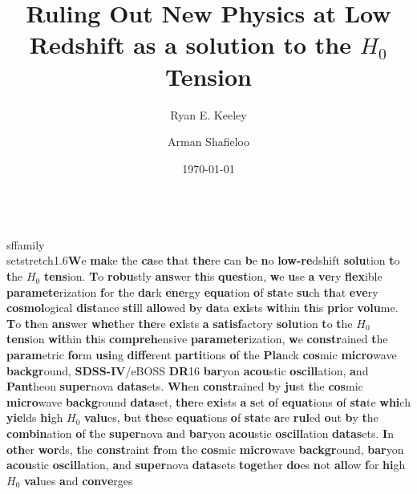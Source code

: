 \documentclass[
\\usepackage{setspace} reprint,
 amsmath,amssymb,
 aps,
]{revtex4-2}
\begin{document}

\title{Ruling Out New Physics at Low Redshift as a solution to the $H_0$ Tension}

\author{Ryan E. Keeley}
\author{Arman Shafieloo}




\date{\today}

\\sffamily\\setstretch{1.6}\textbf{W}e \textbf{ma}ke \textbf{t}he \textbf{ca}se \textbf{th}at \textbf{the}re \textbf{c}an \textbf{b}e \textbf{n}o \textbf{low-re}dshift \textbf{solu}tion \textbf{t}o \textbf{t}he $H_0$ \textbf{tens}ion. \textbf{T}o \textbf{robu}stly \textbf{ans}wer \textbf{th}is \textbf{quest}ion, \textbf{w}e \textbf{u}se \textbf{a} \textbf{ve}ry \textbf{flex}ible \textbf{paramete}rization \textbf{f}or \textbf{t}he \textbf{da}rk \textbf{ene}rgy \textbf{equa}tion \textbf{o}f \textbf{sta}te \textbf{su}ch \textbf{th}at \textbf{eve}ry \textbf{cosmol}ogical \textbf{dist}ance \textbf{sti}ll \textbf{allo}wed \textbf{b}y \textbf{da}ta \textbf{exi}sts \textbf{wit}hin \textbf{th}is \textbf{pri}or \textbf{volu}me. \textbf{T}o \textbf{th}en \textbf{ans}wer \textbf{whet}her \textbf{the}re \textbf{exi}sts \textbf{a} \textbf{satisf}actory \textbf{solu}tion \textbf{t}o \textbf{t}he $H_0$ \textbf{tens}ion \textbf{wit}hin \textbf{th}is \textbf{compreh}ensive \textbf{parameter}ization, \textbf{w}e \textbf{constr}ained \textbf{t}he \textbf{param}etric \textbf{fo}rm \textbf{usi}ng \textbf{diffe}rent \textbf{parti}tions \textbf{o}f \textbf{t}he \textbf{Pla}nck \textbf{cos}mic \textbf{micro}wave \textbf{backgr}ound, \textbf{SDSS-IV}/eBOSS \textbf{DR}16 \textbf{bar}yon \textbf{acou}stic \textbf{oscill}ation, \textbf{a}nd \textbf{Pant}heon \textbf{super}nova \textbf{datas}ets. \textbf{Wh}en \textbf{constr}ained \textbf{b}y \textbf{ju}st \textbf{t}he \textbf{cos}mic \textbf{micro}wave \textbf{backg}round \textbf{data}set, \textbf{the}re \textbf{exi}sts \textbf{a} \textbf{s}et \textbf{o}f \textbf{equat}ions \textbf{o}f \textbf{sta}te \textbf{whi}ch \textbf{yie}lds \textbf{hi}gh $H_0$ \textbf{valu}es, \textbf{b}ut \textbf{the}se \textbf{equat}ions \textbf{o}f \textbf{sta}te \textbf{a}re \textbf{rul}ed \textbf{o}ut \textbf{b}y \textbf{t}he \textbf{combin}ation \textbf{o}f \textbf{t}he \textbf{super}nova \textbf{a}nd \textbf{bar}yon \textbf{acou}stic \textbf{oscill}ation \textbf{datas}ets. \textbf{I}n \textbf{oth}er \textbf{wor}ds, \textbf{t}he \textbf{const}raint \textbf{fr}om \textbf{t}he \textbf{cos}mic \textbf{micro}wave \textbf{backgr}ound, \textbf{bar}yon \textbf{acou}stic \textbf{oscill}ation, \textbf{a}nd \textbf{super}nova \textbf{data}sets \textbf{toge}ther \textbf{do}es \textbf{n}ot \textbf{all}ow \textbf{f}or \textbf{hi}gh $H_0$ \textbf{val}ues \textbf{a}nd \textbf{conve}rges 
\end{document}
